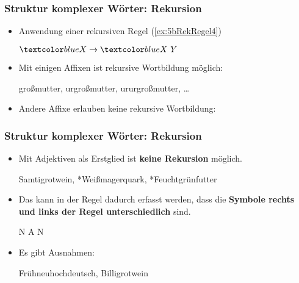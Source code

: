 \begin{frame}
\frametitle{Struktur komplexer Wörter: Rekursion}

\begin{minipage}{.74\textwidth}

\begin{itemize}
	\item Anwendung einer rekursiven Regel (\ref{ex:5bRekRegel4})
	
	\ea \label{ex:5bRekRegel4} $\alertblue{X} \rightarrow \alertblue{X}~Y$	
	\z 
	
	\item Mit einigen Affixen ist rekursive Wortbildung möglich:
	
	\ea {}großmutter, urgroßmutter, ururgroßmutter, \ldots
	\z 
	
	\item Andere Affixe erlauben keine rekursive Wortbildung:
	\ea 
		\z 
	\z 
	
\end{itemize}

\end{minipage}
\begin{minipage}[c]{.25\textwidth}

\begin{figure}
	\centering
	\scalebox{.9}{
		\begin{forest}
			[X
			[X
			[X
			[X]
			[Y]
			]
			[Y]
			]
			[Y]
			]	
		\end{forest}	
	}
\end{figure}

\end{minipage}

\end{frame}


\begin{frame}
\frametitle{Struktur komplexer Wörter: Rekursion}

\begin{itemize}
	\item Mit Adjektiven als Erstglied ist \textbf{keine Rekursion} möglich.
	
	\ea *Samtigrotwein, *Weißmagerquark, *Feuchtgrünfutter
	\z
	
	\item Das kann in der Regel dadurch erfasst werden, dass die \textbf{Symbole rechts und links der Regel unterschiedlich} sind.
	
	\ea N \ras A N
	\z   
	
	\item Es gibt Ausnahmen:
	
	\ea Frühneuhochdeutsch, Billigrotwein
	\z 
	
\end{itemize}

\end{frame}


